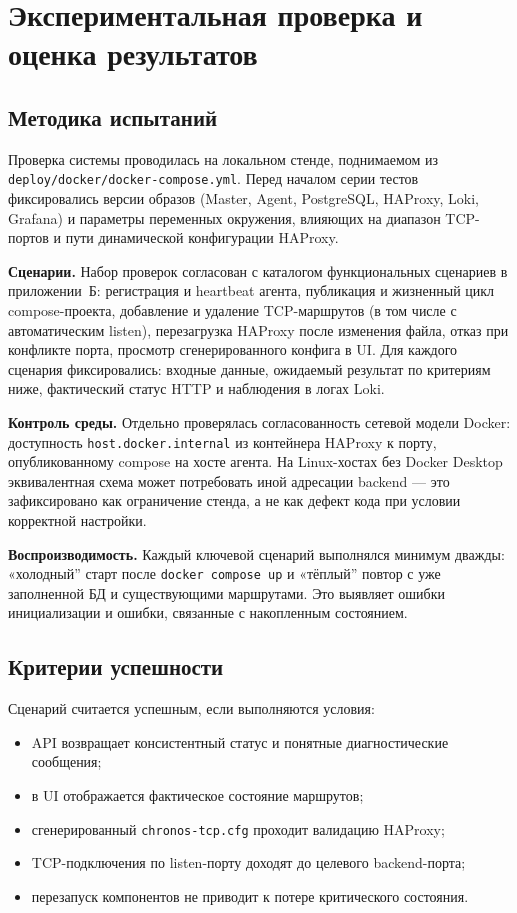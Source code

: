 \section{Экспериментальная проверка и оценка результатов}

\subsection{Методика испытаний}

Проверка системы проводилась на локальном стенде, поднимаемом из \texttt{deploy/docker/docker-compose.yml}. Перед началом серии тестов фиксировались версии образов (Master, Agent, PostgreSQL, HAProxy, Loki, Grafana) и параметры переменных окружения, влияющих на диапазон TCP-портов и пути динамической конфигурации HAProxy.

\textbf{Сценарии.} Набор проверок согласован с каталогом функциональных сценариев в приложении~Б: регистрация и heartbeat агента, публикация и жизненный цикл compose-проекта, добавление и удаление TCP-маршрутов (в том числе с автоматическим listen), перезагрузка HAProxy после изменения файла, отказ при конфликте порта, просмотр сгенерированного конфига в UI. Для каждого сценария фиксировались: входные данные, ожидаемый результат по критериям ниже, фактический статус HTTP и наблюдения в логах Loki.

\textbf{Контроль среды.} Отдельно проверялась согласованность сетевой модели Docker: доступность \texttt{host.docker.internal} из контейнера HAProxy к порту, опубликованному compose на хосте агента. На Linux-хостах без Docker Desktop эквивалентная схема может потребовать иной адресации backend --- это зафиксировано как ограничение стенда, а не как дефект кода при условии корректной настройки.

\textbf{Воспроизводимость.} Каждый ключевой сценарий выполнялся минимум дважды: «холодный'' старт после \texttt{docker compose up} и «тёплый'' повтор с уже заполненной БД и существующими маршрутами. Это выявляет ошибки инициализации и ошибки, связанные с накопленным состоянием.

\subsection{Критерии успешности}

Сценарий считается успешным, если выполняются условия:
\begin{itemize}[leftmargin=1.5cm]
  \item API возвращает консистентный статус и понятные диагностические сообщения;
  \item в UI отображается фактическое состояние маршрутов;
  \item сгенерированный \texttt{chronos-tcp.cfg} проходит валидацию HAProxy;
  \item TCP-подключения по listen-порту доходят до целевого backend-порта;
  \item перезапуск компонентов не приводит к потере критического состояния.
\end{itemize}

